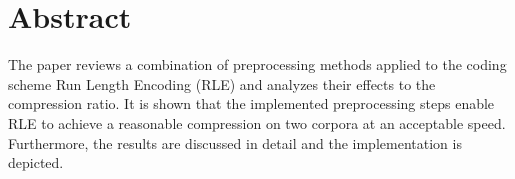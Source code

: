 \chapter*{Abstract}
The paper reviews a combination of preprocessing methods applied to the coding scheme Run Length Encoding (RLE) and analyzes their effects to the compression ratio. It is shown that the implemented preprocessing steps enable RLE to achieve a reasonable compression on two corpora at an acceptable speed. Furthermore, the results are discussed in detail and the implementation is depicted.